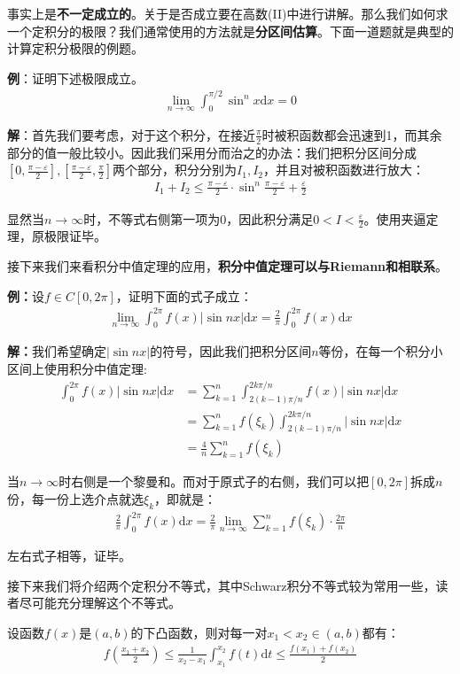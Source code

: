\documentclass{ctexart}
\let\oldtextbf\textbf %
\renewcommand{\textbf}[1]{\textcolor{btex}{\oldtextbf{#1}}} %
\begin{document}
事实上是\textbf{不一定成立的}。关于是否成立要在高数(II)中进行讲解。那么我们如何求一个定积分的极限？我们通常使用的方法就是\textbf{分区间估算}。下面一道题就是典型的计算定积分极限的例题。

\textbf{例}：证明下述极限成立。
\begin{align*}
\lim_{n\to\infty}\int_0^{\pi/2}\sin^n x\mathrm{d}x=0
\end{align*}

\textbf{解}：首先我们要考虑，对于这个积分，在接近$\frac{\pi}{2}$时被积函数都会迅速到1，而其余部分的值一般比较小。因此我们采用分而治之的办法：我们把积分区间分成$[0,\frac{\pi-\varepsilon}{2}],[\frac{\pi-\varepsilon}{2},\frac{\pi}{2}]$两个部分，积分分别为$I_1,I_2$，并且对被积函数进行放大：
\begin{align*}
    I_1+I_2\leq \frac{\pi-\varepsilon}{2}\cdot \sin^n \frac{\pi-\varepsilon}{2}+\frac{\varepsilon}{2}
\end{align*}

显然当$n\to\infty$时，不等式右侧第一项为0，因此积分满足$0<I<\frac{\varepsilon}{2}$。使用夹逼定理，原极限证毕。

接下来我们来看积分中值定理的应用，\textbf{积分中值定理可以与Riemann和相联系}。

\textbf{例：}设$f\in C[0,2\pi]$，证明下面的式子成立：
\begin{align*}
    \lim_{n\to\infty}\int_0^{2\pi}f(x)|\sin nx|\mathrm{d}x=\frac{2}{\pi}\int_0^{2\pi}f(x)\mathrm{d}x
\end{align*}

\textbf{解：}我们希望确定$|\sin nx|$的符号，因此我们把积分区间$n$等份，在每一个积分小区间上使用积分中值定理:
\begin{align*}
    \int_0^{2\pi} f(x)|\sin nx|\mathrm{d}x&=\sum_{k=1}^n\int_{2(k-1)\pi/n}^{2k\pi/n}f(x)|\sin nx|\mathrm{d}x\\
    &=\sum_{k=1}^nf(\xi_k)\int_{2(k-1)\pi/n}^{2k\pi/n}|\sin nx|\mathrm{d}x\\
    &=\frac{4}{n}\sum_{k=1}^n f(\xi_k)
\end{align*}

当$n\to\infty$时右侧是一个黎曼和。而对于原式子的右侧，我们可以把$[0,2\pi]$拆成$n$份，每一份上选介点就选$\xi_k$，即就是：
\begin{align*}
    \frac{2}{\pi}\int_0^{2\pi}f(x)\mathrm{d}x=\frac{2}{\pi}\lim_{n\to\infty}\sum_{k=1}^nf(\xi_k)\cdot\frac
    {2\pi}{n}
\end{align*}

左右式子相等，证毕。

接下来我们将介绍两个定积分不等式，其中Schwarz积分不等式较为常用一些，读者尽可能充分理解这个不等式。
\begin{tcolorbox}[
    colback=bac1,     %
    colframe=fra1,   %
    coltitle=white,             %
    coltext=tex1,
    title=Hadamard不等式,
    fonttitle=\bfseries,        %
arc=3mm,                     %
breakable
]
设函数$f(x)$是$(a,b)$的下凸函数，则对每一对$x_1<x_2\in(a,b)$都有：
\begin{align*}
    f(\frac{x_1+x_2}{2})\leq \frac{1}{x_2-x_1}\int_{x_1}^{x_2}f(t)\mathrm{d}t\leq \frac{f(x_1)+f(x_2)}{2}\tag{5-15}
\end{align*}
\end{tcolorbox}
\end{document}
